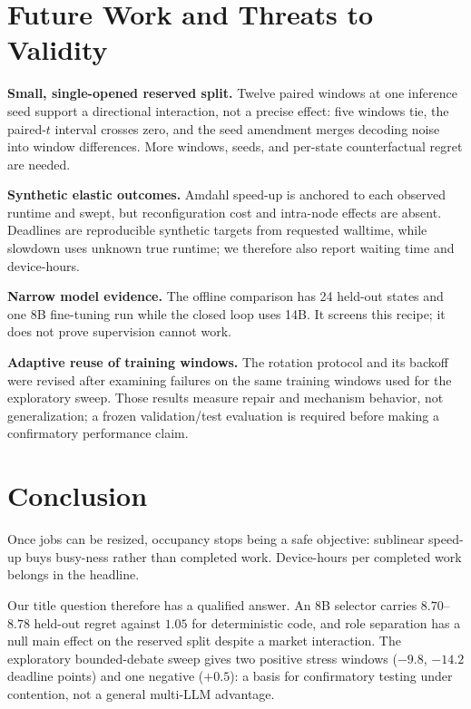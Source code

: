 \documentclass[conference]{IEEEtran}
\begin{document}



\section{Future Work and Threats to Validity}
\label{sec:future}
\label{sec:threats}

\textbf{Small, single-opened reserved split.} Twelve paired windows at one inference seed support a
directional interaction, not a precise effect: five windows tie, the paired-$t$ interval crosses zero,
and the seed amendment merges decoding noise into window differences.  More windows, seeds, and
per-state counterfactual regret are needed.

\textbf{Synthetic elastic outcomes.}  Amdahl speed-up is anchored to each observed runtime and swept,
but reconfiguration cost and intra-node effects are absent.  Deadlines are reproducible synthetic targets
from requested walltime, while slowdown uses unknown true runtime; we therefore also report waiting time
and device-hours.

\textbf{Narrow model evidence.} The offline comparison has 24 held-out states and one 8B fine-tuning run
while the closed loop uses 14B.  It screens this recipe; it does not prove supervision cannot work.

\textbf{Adaptive reuse of training windows.} The rotation protocol and its backoff were revised after
examining failures on the same training windows used for the exploratory sweep. Those results measure
repair and mechanism behavior, not generalization; a frozen validation/test evaluation is required
before making a confirmatory performance claim.

\section{Conclusion}

Once jobs can be resized, occupancy stops being a safe objective: sublinear speed-up buys busy-ness rather
than completed work.  Device-hours per completed work belongs in the headline.

Our title question therefore has a qualified answer.  An 8B selector carries $8.70$--$8.78$ held-out
regret against $1.05$ for deterministic code, and role separation has a null main effect on the reserved
split despite a market interaction.  The exploratory bounded-debate sweep gives two positive stress
windows ($-9.8$, $-14.2$ deadline points) and one negative ($+0.5$): a basis for confirmatory testing
under contention, not a general multi-LLM advantage.
\end{document}
